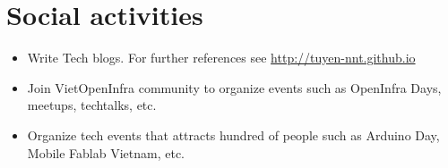 \documentclass[letterpaper,11pt]{article}
\newcommand{\resumeItemNornal}[1]{
  \item\small{
    {#1 \vspace{-2pt}}
  }
}
\newcommand{\resumeSubItemNormal}[1]{\resumeItemNornal{#1}\vspace{-4pt}}
\newcommand{\resumeSubHeadingListStart}{\begin{itemize}[leftmargin=*]}
\newcommand{\resumeSubHeadingListEnd}{\end{itemize}}
\begin{document}


\section{Social activities}
  \resumeSubHeadingListStart
    \resumeSubItemNormal
      {Write Tech blogs. For further references see \url{http://tuyen-nnt.github.io}}
    \resumeSubItemNormal
      {Join VietOpenInfra community to organize events such as OpenInfra Days, meetups, techtalks, etc.}
    \resumeSubItemNormal
      {Organize tech events that attracts hundred of people such as Arduino Day, Mobile Fablab Vietnam, etc.}
\resumeSubHeadingListEnd



\end{document}
